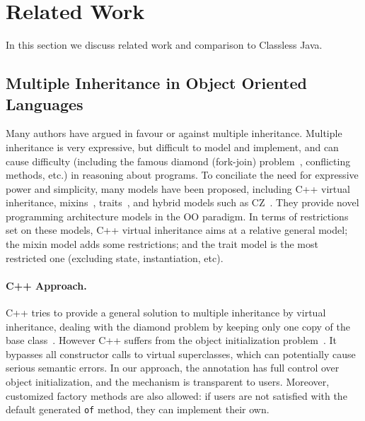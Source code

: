 \section{Related Work}\label{sec:related}
In this section we discuss related work and comparison to Classless Java.



\subsection{Multiple Inheritance in Object Oriented Languages}
Many authors have argued in favour or against multiple inheritance.  Multiple
inheritance is very expressive, but difficult to model and implement, and can
cause difficulty (including the famous diamond (fork-join)
problem~\cite{bracha90mixin,Sak89dis}, conflicting methods, etc.) in reasoning about
programs. To conciliate the need for expressive power and simplicity, many
models have been proposed, including C++ virtual inheritance,
mixins~\cite{bracha90mixin}, traits~\cite{scharli03traits}, and hybrid models
such as CZ~\cite{malayeri2009cz}.  They provide novel programming architecture
models in the OO paradigm. In terms of restrictions set on these models, C++
virtual inheritance aims at a relative general model; the mixin model adds some
restrictions; and the trait model is the most restricted one (excluding
state, instantiation, etc).

\paragraph{C++ Approach.}
C++ tries to provide a general solution to multiple inheritance by
virtual inheritance, dealing with the diamond problem by keeping only
one copy of the base class~\cite{ellis1990annotated}. However C++
suffers from the object initialization problem~\cite{malayeri2009cz}.
It bypasses all constructor calls to virtual superclasses, which can
potentially cause serious semantic errors. In our approach, the \mixin
annotation has full control over object initialization,
and the mechanism is transparent to users. Moreover, customized factory
methods are also allowed: if users are not satisfied with the default
generated \texttt{of} method, they can implement their own.

